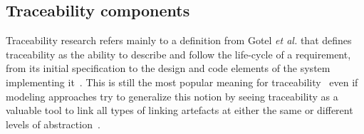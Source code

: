 
\subsection{Traceability components}
Traceability research refers mainly to a definition from Gotel \textit{et al.} that defines traceability as the  ability  to  describe and  follow  the life-cycle of a requirement, from its initial specification to the design and code elements of the system implementing it~\cite{gotel1994}. This is still the most popular meaning for traceability~\cite{bouillon2013-survey-on-usage-scenario-requirements-traceability-in-practice,badreddin2014-req-traceability-model-based-approach} even if modeling approaches try to generalize this notion by seeing traceability as a valuable tool to link all types of linking artefacts at either the same or different levels of abstraction~\cite{mader2007-tracing-unified-process,tekinerdogan2007-metamodel-for-tracing-concers-accross-life-cycle}. %

